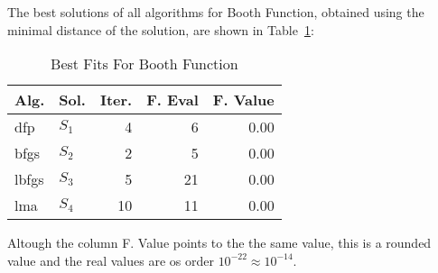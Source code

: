 The best solutions of all algorithms for Booth Function, obtained using the minimal
distance of the solution, are shown in Table~\ref{solutions:booth}:
\begin{table}[H]
\centering
\caption{Best Fits For Booth Function}
\label{solutions:booth}
\begin{tabular}{llrrr}
\toprule
 Alg. &    Sol. &  Iter. &  F. Eval &  F. Value \\
\midrule
  dfp & $S_{1}$ &      4 &        6 &      0.00 \\
 bfgs & $S_{2}$ &      2 &        5 &      0.00 \\
lbfgs & $S_{3}$ &      5 &       21 &      0.00 \\
  lma & $S_{4}$ &     10 &       11 &      0.00 \\
\bottomrule
\end{tabular}
\end{table}

Altough the column F. Value points to the the same value, this is a rounded value
and the real values are os order $10^{-22} \approx 10^{-14}$.
